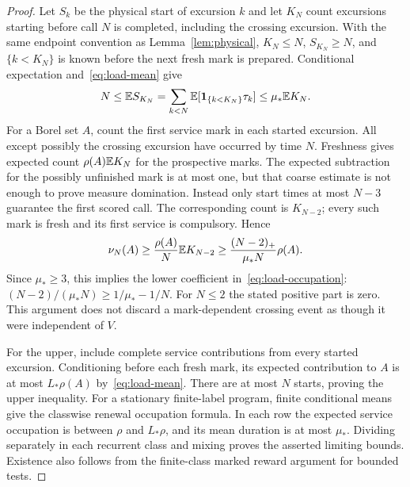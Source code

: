 \begin{proof}
Let $S_k$ be the physical start of excursion $k$ and let $K_N$ count excursions starting before call $N$ is completed, including the crossing excursion. With the same endpoint convention as Lemma~\ref{lem:physical}, $K_N\le N$, $S_{K_N}\ge N$, and $\{k<K_N\}$ is known before the next fresh mark is prepared. Conditional expectation and~\eqref{eq:load-mean} give
\[
 N\le\mathbb E S_{K_N}
   =\sum_{k<N}\mathbb E[\mathbf 1_{\{k<K_N\}}\tau_k]
   \le\mu_*\mathbb E K_N.
\]
For a Borel set $A$, count the first service mark in each started excursion. All except possibly the crossing excursion have occurred by time $N$. Freshness gives expected count $\rho(A)\mathbb E K_N$ for the prospective marks. The expected subtraction for the possibly unfinished mark is at most one, but that coarse estimate is not enough to prove measure domination. Instead only start times at most $N-3$ guarantee the first scored call. The corresponding count is $K_{N-2}$; every such mark is fresh and its first service is compulsory. Hence
\begin{equation}\label{eq:load-first-count}
 \nu_N(A)\ge\frac{\rho(A)}{N}\mathbb E K_{N-2}
            \ge\frac{(N-2)_+}{\mu_*N}\rho(A).
\end{equation}
Since $\mu_*\ge3$, this implies the lower coefficient in~\eqref{eq:load-occupation}: $(N-2)/(\mu_*N)\ge1/\mu_*-1/N$. For $N\le2$ the stated positive part is zero. This argument does not discard a mark-dependent crossing event as though it were independent of $V$.

For the upper, include complete service contributions from every started excursion. Conditioning before each fresh mark, its expected contribution to $A$ is at most $L_*\rho(A)$ by~\eqref{eq:load-mean}. There are at most $N$ starts, proving the upper inequality. For a stationary finite-label program, finite conditional means give the classwise renewal occupation formula. In each row the expected service occupation is between $\rho$ and $L_*\rho$, and its mean duration is at most $\mu_*$. Dividing separately in each recurrent class and mixing proves the asserted limiting bounds. Existence also follows from the finite-class marked reward argument for bounded tests.


\end{proof}
